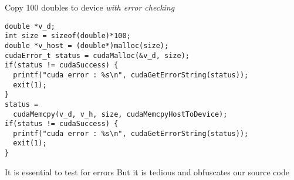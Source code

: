 \begin{frame}[fragile]{}

    \begin{code}{Copy 100 doubles to device \emph{with error checking}}
        \begin{lstlisting}[style=boxcuda]
double *v_d;
int size = sizeof(double)*100;
double *v_host = (double*)malloc(size);
cudaError_t status = cudaMalloc(&v_d, size);
if(status != cudaSuccess) {
  printf("cuda error : %s\n", cudaGetErrorString(status));
  exit(1);
}
status =
  cudaMemcpy(v_d, v_h, size, cudaMemcpyHostToDevice);
if(status != cudaSuccess) {
  printf("cuda error : %s\n", cudaGetErrorString(status));
  exit(1);
}
        \end{lstlisting}
    \end{code}

    \begin{info}{It is essential to test for errors}
        But it is tedious and obfuscates our source code
    \end{info}
\end{frame}

